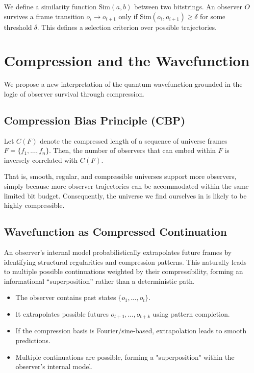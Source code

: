 \documentclass[12pt]{article}
\begin{document}
We define a similarity function $\text{Sim}(a, b)$ between two bitstrings. An observer $O$ survives a frame transition $o_i \to o_{i+1}$ only if $\text{Sim}(o_i, o_{i+1}) \ge \delta$ for some threshold $\delta$. This defines a selection criterion over possible trajectories.

\section{Compression and the Wavefunction}

We propose a new interpretation of the quantum wavefunction grounded in the logic of observer survival through compression.

\subsection{Compression Bias Principle (CBP)}

Let $C(F)$ denote the compressed length of a sequence of universe frames $F = \{f_1, \ldots, f_n\}$. Then, the number of observers that can embed within $F$ is inversely correlated with $C(F)$.

That is, smooth, regular, and compressible universes support more observers, simply because more observer trajectories can be accommodated within the same limited bit budget. Consequently, the universe we find ourselves in is likely to be highly compressible.

\subsection{Wavefunction as Compressed Continuation}

An observer’s internal model probabilistically extrapolates future frames by identifying structural regularities and compression patterns. This naturally leads to multiple possible continuations weighted by their compressibility, forming an informational “superposition” rather than a deterministic path.

\begin{itemize}
    \item The observer contains past states $\{o_1, \ldots, o_t\}$.
    \item It extrapolates possible futures $o_{t+1}, \ldots, o_{t+k}$ using pattern completion.
    \item If the compression basis is Fourier/sine-based, extrapolation leads to smooth predictions.
    \item Multiple continuations are possible, forming a "superposition" within the observer's internal model.
\end{itemize}
\end{document}
